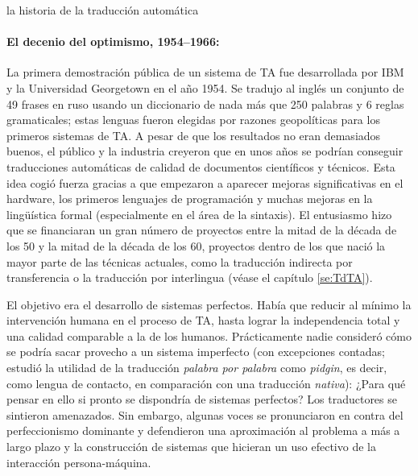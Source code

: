 \begin{persabermes}{la historia de la traducción automática}
\paragraph{El decenio del optimismo, 1954--1966:} La primera demostración pública de un sistema de TA fue desarrollada por IBM y la Universidad Georgetown en el año 1954. Se tradujo al inglés un conjunto de 49 frases en ruso usando un diccionario de nada más que 250 palabras y 6 reglas gramaticales; estas lenguas fueron elegidas por razones geopolíticas para los primeros sistemas de TA. A pesar de que los resultados no eran demasiados buenos, el público y la industria creyeron que en unos años se podrían conseguir traducciones automáticas de calidad de documentos científicos y técnicos. Esta idea cogió fuerza gracias a que empezaron a aparecer mejoras significativas en el hardware, los primeros lenguajes de programación y muchas mejoras en la lingüística formal (especialmente en el área de la sintaxis). El entusiasmo hizo que se financiaran un gran número de proyectos entre la mitad de la década de los 50 y la mitad de la década de los 60, proyectos dentro de los que nació la mayor parte de las técnicas actuales, como la traducción indirecta por transferencia o la traducción por interlingua (véase el capítulo \ref{se:TdTA}). 

El objetivo era el desarrollo de sistemas perfectos. Había que reducir al mínimo la intervención humana en el proceso de TA, hasta lograr la independencia total y una calidad comparable a la de los humanos. Prácticamente nadie consideró cómo se podría sacar provecho a un sistema imperfecto (con excepciones contadas; \cite{masterman67b} estudió la utilidad de la traducción \emph{palabra por palabra} como \emph{pidgin}, es decir, como lengua de contacto, en comparación con una traducción \emph{nativa}): ¿Para qué pensar en ello si pronto se dispondría de sistemas perfectos? Los traductores se sintieron amenazados. Sin embargo, algunas voces se pronunciaron en contra del perfeccionismo dominante y defendieron una aproximación al problema a más a largo plazo y la construcción de sistemas que hicieran un uso efectivo de la interacción persona-máquina. 


\end{persabermes}
